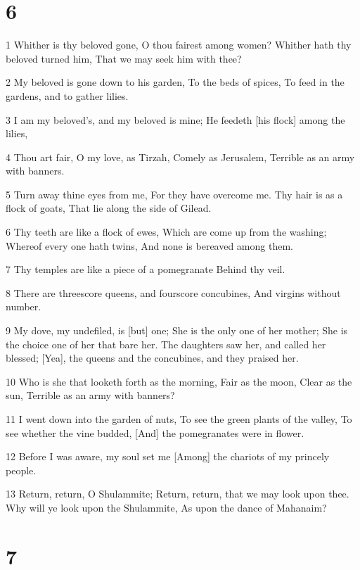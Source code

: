 \chapter{6}

\par 1 Whither is thy beloved gone, O thou fairest among women? Whither hath thy beloved turned him, That we may seek him with thee?
\par 2 My beloved is gone down to his garden, To the beds of spices, To feed in the gardens, and to gather lilies.
\par 3 I am my beloved's, and my beloved is mine; He feedeth [his flock] among the lilies,
\par 4 Thou art fair, O my love, as Tirzah, Comely as Jerusalem, Terrible as an army with banners.
\par 5 Turn away thine eyes from me, For they have overcome me. Thy hair is as a flock of goats, That lie along the side of Gilead.
\par 6 Thy teeth are like a flock of ewes, Which are come up from the washing; Whereof every one hath twins, And none is bereaved among them.
\par 7 Thy temples are like a piece of a pomegranate Behind thy veil.
\par 8 There are threescore queens, and fourscore concubines, And virgins without number.
\par 9 My dove, my undefiled, is [but] one; She is the only one of her mother; She is the choice one of her that bare her. The daughters saw her, and called her blessed; [Yea], the queens and the concubines, and they praised her.
\par 10 Who is she that looketh forth as the morning, Fair as the moon, Clear as the sun, Terrible as an army with banners?
\par 11 I went down into the garden of nuts, To see the green plants of the valley, To see whether the vine budded, [And] the pomegranates were in flower.
\par 12 Before I was aware, my soul set me [Among] the chariots of my princely people.
\par 13 Return, return, O Shulammite; Return, return, that we may look upon thee. Why will ye look upon the Shulammite, As upon the dance of Mahanaim?

\chapter{7}

